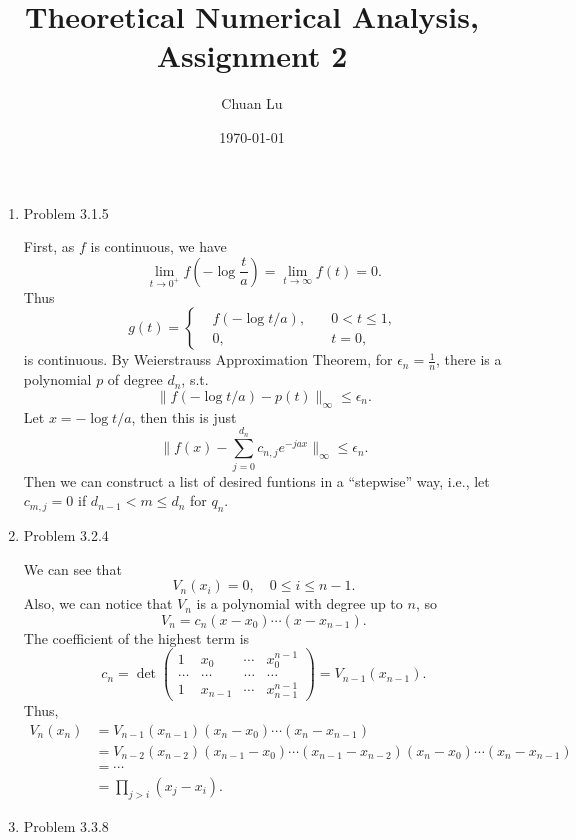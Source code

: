 \documentclass{article}%
\begin{document}
\title{Theoretical Numerical Analysis, Assignment 2}
\author{Chuan Lu}
\date{\today}
\maketitle

\begin{enumerate}

\item Problem 3.1.5

First, as $f$ is continuous, we have
$$
\lim_{t\to 0^+}f(-\log\frac{t}{a}) = \lim_{t\to\infty}f(t) = 0.
$$
Thus 
$$
g(t) = \left\{
\begin{aligned}
&f(-\log t/a), \quad & 0 < t \le 1, \\
&0, \quad & t = 0,
\end{aligned}
\right.
$$
is continuous. By Weierstrauss Approximation Theorem, for $\epsilon_n = \frac{1}{n} $, there is a polynomial $p$ of degree $d_n $, s.t.
$$
\lVert f(-\log t/a) - p(t)\rVert_\infty \le \epsilon_n.
$$
Let $x = -\log t/a$, then this is just 
$$
\lVert f(x) - \sum_{j=0}^{d_n}c_{n, j}e^{-jax}\rVert_\infty \le \epsilon_n.
$$
Then we can construct a list of desired funtions in a ``stepwise'' way, i.e., let $c_{m, j} = 0 $ if $d_{n-1} < m \le d_n$ for $q_n $.

\item Problem 3.2.4

We can see that 
$$
V_n(x_i) = 0, \quad 0\le i\le n-1.
$$
Also, we can notice that $V_n $ is a polynomial with degree up to $n$, so
$$
V_n = c_n(x-x_0)\cdots(x-x_{n-1}).
$$
The coefficient of the highest term is 
$$
c_n = \det\left(
\begin{matrix}
1 & x_0 & \cdots & x_0^{n-1} \\
\hdots & \hdots & \hdots & \hdots \\
1 & x_{n-1} & \cdots & x_{n-1}^{n-1}
\end{matrix}
\right)
= V_{n-1}(x_{n-1}).
$$
Thus, 
$$
\begin{aligned}
V_n(x_n) &= V_{n-1}(x_{n-1})(x_n-x_0)\cdots(x_n-x_{n-1}) \\
&= V_{n-2}(x_{n-2})(x_{n-1}-x_0)\cdots(x_{n-1}-x_{n-2})(x_n-x_0)\cdots(x_n-x_{n-1}) \\
&= \cdots \\
&= \prod_{j>i}(x_j-x_i).
\end{aligned}
$$

\item Problem 3.3.8


\end{enumerate}
\end{document}
